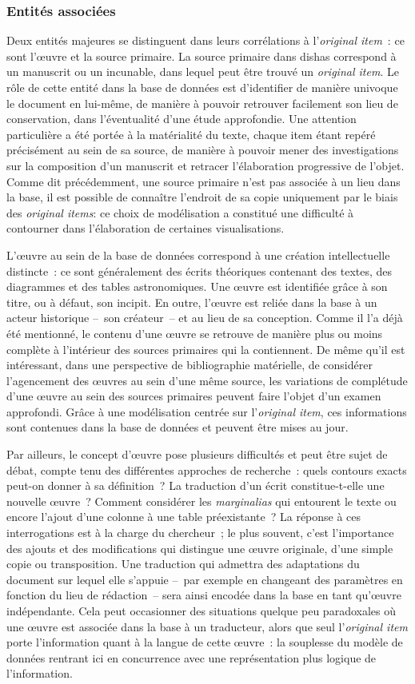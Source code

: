\documentclass[a4paper,12pt,twoside]{book}
\newcommand{\eng}{\emph}
\newcommand{\oi}{\eng{original item}\xspace}
\newcommand{\ois}{\eng{original items}\xspace}
\newcommand{\dishas}{\gls{dishas}\xspace}
\begin{document}
			\subsubsection{Entités associées}
Deux entités majeures se distinguent dans leurs corrélations à l'\oi~: ce sont l'œuvre et la source primaire. La source primaire dans \dishas correspond à un manuscrit ou un incunable, dans lequel peut être trouvé un \oi. Le rôle de cette entité dans la base de données est d'identifier de manière univoque le document en lui-même, de manière à pouvoir retrouver facilement son lieu de conservation, dans l'éventualité d'une étude approfondie. Une attention particulière a été portée à la matérialité du texte, chaque item étant repéré précisément au sein de sa source, de manière à pouvoir mener des investigations sur la composition d'un manuscrit et retracer l'élaboration progressive de l'objet. Comme dit précédemment, une source primaire n'est pas associée à un lieu dans la base, il est possible de connaître l'endroit de sa copie uniquement par le biais des \ois: ce choix de modélisation a constitué une difficulté à contourner dans l'élaboration de certaines visualisations.

L'œuvre au sein de la base de données correspond à une création intellectuelle distincte~: ce sont généralement des écrits théoriques contenant des textes, des diagrammes et des tables astronomiques. Une œuvre est identifiée grâce à son titre, ou à défaut, son incipit. En outre, l'œuvre est reliée dans la base à un acteur historique –~son créateur~– et au lieu de sa conception. Comme il l'a déjà été mentionné, le contenu d'une œuvre se retrouve de manière plus ou moins complète à l'intérieur des sources primaires qui la contiennent. De même qu'il est intéressant, dans une perspective de bibliographie matérielle, de considérer l'agencement des œuvres au sein d'une même source, les variations de complétude d'une œuvre au sein des sources primaires peuvent faire l'objet d'un examen approfondi. Grâce à une modélisation centrée sur l'\oi, ces informations sont contenues dans la base de données et peuvent être mises au jour.

Par ailleurs, le concept d'œuvre pose plusieurs difficultés et peut être sujet de débat, compte tenu des différentes approches de recherche~: quels contours exacts peut-on donner à sa définition~? La traduction d'un écrit constitue-t-elle une nouvelle œuvre~? Comment considérer les \eng{marginalias} qui entourent le texte ou encore l'ajout d'une colonne à une table préexistante~? La réponse à ces interrogations est à la charge du chercheur~; le plus souvent, c'est l'importance des ajouts et des modifications qui distingue une œuvre originale, d'une simple copie ou transposition. Une traduction qui admettra des adaptations du document sur lequel elle s'appuie –~par exemple en changeant des paramètres en fonction du lieu de rédaction~– sera ainsi encodée dans la base en tant qu'œuvre indépendante. Cela peut occasionner des situations quelque peu paradoxales où une œuvre est associée dans la base à un traducteur, alors que seul l'\oi porte l'information quant à la langue de cette œuvre~: la souplesse du modèle de données rentrant ici en concurrence avec une représentation plus logique de l'information.
\end{document}

